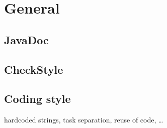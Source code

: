 \section{General}

\subsection{JavaDoc}

\subsection{CheckStyle}

\subsection{Coding style}
hardcoded strings, task separation, reuse of code, \ldots
 